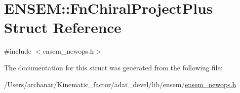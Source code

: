 \hypertarget{structENSEM_1_1FnChiralProjectPlus}{}\section{E\+N\+S\+EM\+:\+:Fn\+Chiral\+Project\+Plus Struct Reference}
\label{structENSEM_1_1FnChiralProjectPlus}


{\ttfamily \#include $<$ensem\+\_\+newops.\+h$>$}



The documentation for this struct was generated from the following file\+:\begin{DoxyCompactItemize}
\item 
/\+Users/archanar/\+Kinematic\+\_\+factor/adat\+\_\+devel/lib/ensem/\mbox{\hyperlink{lib_2ensem_2ensem__newops_8h}{ensem\+\_\+newops.\+h}}\end{DoxyCompactItemize}
